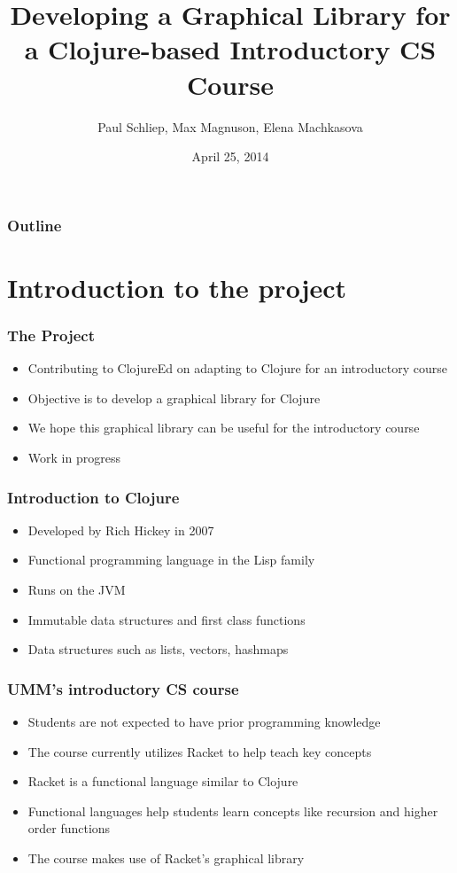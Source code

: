 \documentclass{beamer}
\begin{document}
\title{Developing a Graphical Library for a Clojure-based Introductory CS Course}
\author{Paul Schliep, Max Magnuson, Elena Machkasova}
\date{April 25, 2014}

\begin{frame}
  \titlepage
\end{frame}

\begin{frame}

  \frametitle{Outline}
\tableofcontents

\end{frame}

\section{Introduction to the project}

\begin{frame}
\frametitle{The Project}
\begin{itemize}
\item Contributing to ClojureEd on adapting to Clojure for an introductory course
\item Objective is to develop a graphical library for Clojure
\item We hope this graphical library can be useful for the introductory course
\item Work in progress
\end{itemize}
\end{frame}

\begin{frame}
\frametitle{Introduction to Clojure}
\begin{itemize}
\item Developed by Rich Hickey in 2007
\item Functional programming language in the Lisp family
\item Runs on the JVM
\item Immutable data structures and first class functions
\item Data structures such as lists, vectors, hashmaps
\end{itemize}
\end{frame}

\begin{frame}
\frametitle{UMM's introductory CS course}
\begin{itemize}
\item Students are not expected to have prior programming knowledge
\item The course currently utilizes Racket to help teach key concepts
\item Racket is a functional language similar to Clojure
\item Functional languages help students learn concepts like recursion and higher order functions
\item The course makes use of Racket's graphical library 
\end{itemize}
\end{frame}
\end{document}
